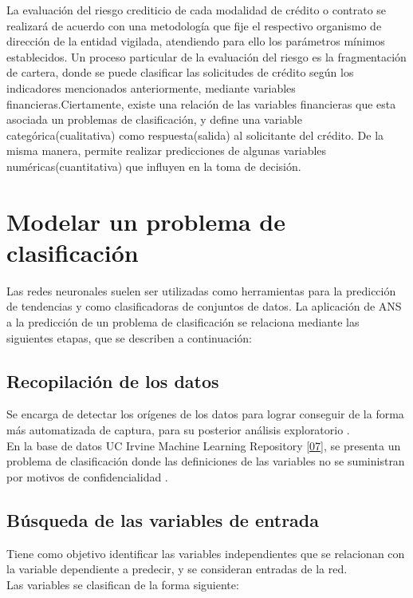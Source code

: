 \documentclass[11pt,titlepage]{report}
\begin{document}
La evaluación del riesgo crediticio de cada modalidad de crédito o contrato se realizará de acuerdo con una metodología que fije el respectivo organismo de dirección de la entidad vigilada, atendiendo para ello los parámetros mínimos establecidos. Un proceso particular de la evaluación del riesgo es la fragmentación de cartera, donde se puede clasificar las solicitudes de crédito según los indicadores mencionados anteriormente, mediante variables financieras.Ciertamente, existe una relación de las variables financieras que esta asociada un problemas de clasificación, y define una variable categórica(cualitativa) como respuesta(salida) al solicitante del crédito. De la misma manera, permite realizar predicciones de algunas variables numéricas(cuantitativa) que influyen en la toma de decisión. 

\section{Modelar un problema de clasificación}
Las redes neuronales suelen ser utilizadas como herramientas para la predicción de tendencias y como clasificadoras de conjuntos de datos.
La aplicación de ANS a la predicción de un problema de clasificación se relaciona mediante las siguientes etapas, que se describen a continuación:

\subsection{Recopilación de los datos} \label{DB}
Se encarga de detectar los orígenes de los datos para lograr conseguir de la forma más automatizada de captura, para su posterior análisis exploratorio \cite{Tes18}.\\
En la base de datos UC Irvine Machine Learning Repository \ref{07}, se presenta un problema de clasificación donde las definiciones de las variables no se suministran por motivos de confidencialidad \cite{Rev19}.

\subsection{Búsqueda de las variables de entrada}
Tiene como objetivo identificar las variables independientes que se relacionan con la variable dependiente a predecir, y se consideran entradas de la red.\\ Las variables se clasifican de la forma siguiente: 
\end{document}
